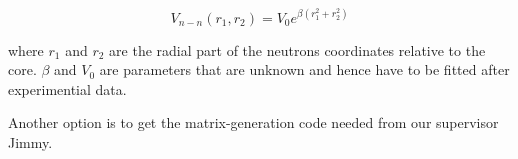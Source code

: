\begin{equation}
V_{n-n}(r_{1} , r_{2}) = V_{0}e^{ \beta (r_1^2 + r_2^2)}
\end{equation}

where $r_1$ and $r_2$ are the radial part of the neutrons coordinates relative to the core. $\beta$ and $V_{0}$ are parameters that are unknown and hence have to be fitted after experimential data. 

Another option is to get the matrix-generation code needed from our supervisor Jimmy.